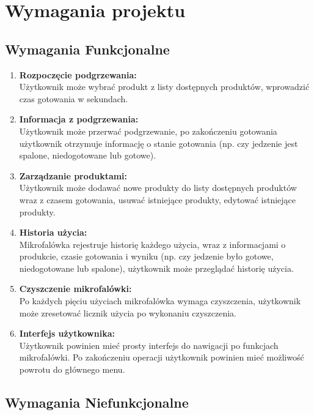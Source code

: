 \chapter{Wymagania projektu}
\section{Wymagania Funkcjonalne}

\begin{enumerate}
    \item \textbf{Rozpoczęcie podgrzewania:} \\
     Użytkownik może wybrać produkt z listy dostępnych produktów, wprowadzić czas gotowania w sekundach.
    
    \item \textbf{Informacja z podgrzewania:} \\
    Użytkownik może przerwać podgrzewanie, po zakończeniu gotowania użytkownik otrzymuje informację o stanie gotowania (np. czy jedzenie jest spalone, niedogotowane lub gotowe).
    
    \item \textbf{Zarządzanie produktami:} \\
    Użytkownik może dodawać nowe produkty do listy dostępnych produktów wraz z czasem gotowania, usuwać istniejące produkty, edytować istniejące produkty.
    
    \item \textbf{Historia użycia:} \\
    Mikrofalówka rejestruje historię każdego użycia, wraz z informacjami o produkcie, czasie gotowania i wyniku (np. czy jedzenie było gotowe, niedogotowane lub spalone), użytkownik może przeglądać historię użycia.
    
    \item \textbf{Czyszczenie mikrofalówki:} \\
    Po każdych pięciu użyciach mikrofalówka wymaga czyszczenia, użytkownik może zresetować licznik użycia po wykonaniu czyszczenia.
    
    \item \textbf{Interfejs użytkownika:} \\
    Użytkownik powinien mieć prosty interfejs do nawigacji po funkcjach mikrofalówki. Po zakończeniu operacji użytkownik powinien mieć możliwość powrotu do głównego menu.
\end{enumerate}

\newpage
\section{Wymagania Niefunkcjonalne}

